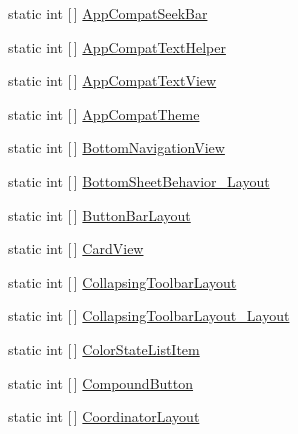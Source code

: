 \begin{DoxyCompactItemize}
static int \mbox{[}$\,$\mbox{]} \mbox{\hyperlink{class_f_w_p_s___app_1_1_droid_1_1_resource_1_1_styleable_a65d274af2356a0f4867f7c554bcaab4a}{App\+Compat\+Seek\+Bar}}
\item 
static int \mbox{[}$\,$\mbox{]} \mbox{\hyperlink{class_f_w_p_s___app_1_1_droid_1_1_resource_1_1_styleable_aa5a059e04aacf8056d36582b693268a6}{App\+Compat\+Text\+Helper}}
\item 
static int \mbox{[}$\,$\mbox{]} \mbox{\hyperlink{class_f_w_p_s___app_1_1_droid_1_1_resource_1_1_styleable_a010b5e042feab7ee4ed35d39d68a68ba}{App\+Compat\+Text\+View}}
\item 
static int \mbox{[}$\,$\mbox{]} \mbox{\hyperlink{class_f_w_p_s___app_1_1_droid_1_1_resource_1_1_styleable_ae614d074d1758067c819cce311eed5a7}{App\+Compat\+Theme}}
\item 
static int \mbox{[}$\,$\mbox{]} \mbox{\hyperlink{class_f_w_p_s___app_1_1_droid_1_1_resource_1_1_styleable_ad7f57780bd3e640dfbf7017cfc4be38c}{Bottom\+Navigation\+View}}
\item 
static int \mbox{[}$\,$\mbox{]} \mbox{\hyperlink{class_f_w_p_s___app_1_1_droid_1_1_resource_1_1_styleable_abe64a937603f74cdd421056e31ae18b2}{Bottom\+Sheet\+Behavior\+\_\+\+Layout}}
\item 
static int \mbox{[}$\,$\mbox{]} \mbox{\hyperlink{class_f_w_p_s___app_1_1_droid_1_1_resource_1_1_styleable_ac63e3cb20b04b8aa5fe92100e08c4bb6}{Button\+Bar\+Layout}}
\item 
static int \mbox{[}$\,$\mbox{]} \mbox{\hyperlink{class_f_w_p_s___app_1_1_droid_1_1_resource_1_1_styleable_a41d2a1efe946ef73dc15c56a83bb4913}{Card\+View}}
\item 
static int \mbox{[}$\,$\mbox{]} \mbox{\hyperlink{class_f_w_p_s___app_1_1_droid_1_1_resource_1_1_styleable_a08424e5dbac4bf90432b1d98874001fa}{Collapsing\+Toolbar\+Layout}}
\item 
static int \mbox{[}$\,$\mbox{]} \mbox{\hyperlink{class_f_w_p_s___app_1_1_droid_1_1_resource_1_1_styleable_a0ca2d7b29d5d90188597f32a6fca566f}{Collapsing\+Toolbar\+Layout\+\_\+\+Layout}}
\item 
static int \mbox{[}$\,$\mbox{]} \mbox{\hyperlink{class_f_w_p_s___app_1_1_droid_1_1_resource_1_1_styleable_a64108b14b34b0a9db18fe0d22276e3d5}{Color\+State\+List\+Item}}
\item 
static int \mbox{[}$\,$\mbox{]} \mbox{\hyperlink{class_f_w_p_s___app_1_1_droid_1_1_resource_1_1_styleable_ac97f73ea391c6e08287eba68c1138d33}{Compound\+Button}}
\item 
static int \mbox{[}$\,$\mbox{]} \mbox{\hyperlink{class_f_w_p_s___app_1_1_droid_1_1_resource_1_1_styleable_adfcff77ece24124029ebc2b622c9771f}{Coordinator\+Layout}}

\end{DoxyCompactItemize}
